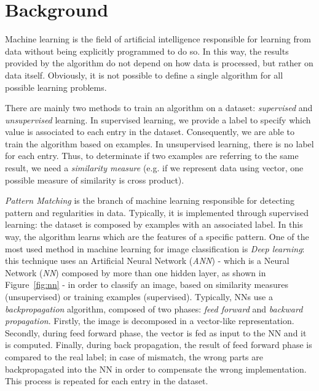 \section{Background}
\label{sec:background}

Machine learning is the field of artificial intelligence responsible for 
learning from data without being explicitly programmed to do so. In this way, 
the results provided by the algorithm do not depend on how data is processed, 
but rather on data itself. Obviously, it is not possible to define a single algorithm 
for all possible learning problems.

There are mainly two methods to train an algorithm on a dataset: 
\textit{supervised} and \textit{unsupervised} learning. In supervised learning, 
we provide a label to specify which value is associated to each entry in the 
dataset. Consequently, we are able to train the algorithm based on examples. 
In unsupervised learning, there is no label for each entry. Thus, to determinate 
if two examples are referring to the same result, we need a 
\textit{similarity measure} (e.g. if we represent data using vector, one 
possible measure of similarity is cross product).

\textit{Pattern Matching} is the branch of machine learning responsible for 
detecting pattern and regularities in data. Typically, it is implemented through 
supervised learning: the dataset is composed by examples with an associated 
label. In this way, the algorithm learns which are the features of a specific 
pattern.
One of the most used method in machine learning for image classification is 
\textit{Deep learning}: this technique uses an Artificial Neural Network (\textit{ANN}) 
- which is a Neural Network (\textit{NN}) composed by more than one hidden layer, 
as shown in Figure~\ref{fig:nn} - in order to classify an image, based on 
similarity measures (unsupervised) or training examples (supervised). Typically, 
NNs use a \textit{backpropagation} algorithm, composed of two phases: 
\textit{feed forward} and \textit{backward propagation}. Firstly, the image is 
decomposed in a vector-like representation. Secondly, during feed forward phase, 
the vector is fed as input to the NN and it is computed. Finally, during back 
propagation, the result of feed forward phase is compared to the real label; in 
case of mismatch, the wrong parts are backpropagated into the NN in order to 
compensate the wrong implementation. This process is repeated for each entry in the 
dataset.

